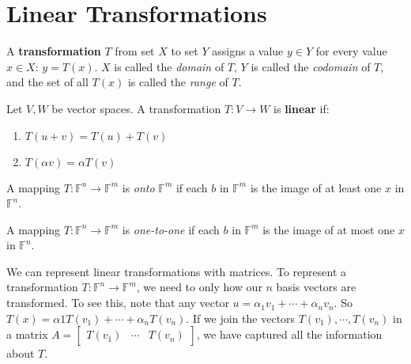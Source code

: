 \section{Linear Transformations}
\begin{definition}
A \textbf{transformation} $T$ from set $X$ to set $Y$ assigns a value $y \in Y$ for every value $x \in X$: $y = T(x)$. $X$ is called the \textit{domain} of $T$, $Y$ is called the \textit{codomain} of $T$, and the set of all $T(x)$ is called the \textit{range} of $T$. 

Let $V, W$ be vector spaces. A transformation $T: V \rightarrow W$ is \textbf{linear} if:
\begin{enumerate}
	\item $T(u + v) = T(u) + T(v)$
	\item $T(\alpha v) = \alpha T(v)$
\end{enumerate}

A mapping $T: \mathbb{F}^{n} \rightarrow \mathbb{F}^{m}$ is \textit{onto} $\mathbb{F}^{m}$ if each $b$ in $\mathbb{F}^{m}$ is the image of at least one $x$ in $\mathbb{F}^{n}$. 

A mapping $T: \mathbb{F}^{n} \rightarrow \mathbb{F}^{m}$ is \textit{one-to-one} if each $b$ in $\mathbb{F}^{m}$ is the image of at most one $x$ in $\mathbb{F}^{n}$. 
\end{definition}

We can represent linear transformations with matrices. To represent a transformation $T: \mathbb{F}^{n} \rightarrow \mathbb{F}^{m}$, we need to only how our $n$ basis vectors are transformed. To see this, note that any vector $u = \alpha_{1} v_{1} + \cdots + \alpha_{n} v_{n}$. So $T(x) = \alpha{1} T(v_{1}) + \cdots + \alpha_{n} T(v_{n})$. If we join the vectors $T(v_{1}), \cdots, T(v_{n})$ in a matrix $A = \begin{bmatrix}
T(v_{1}) & \cdots & T(v_{n})
\end{bmatrix}$, we have captured all the information about $T$. 

